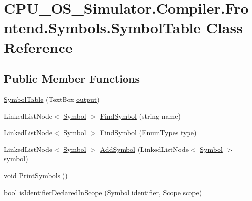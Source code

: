 \hypertarget{class_c_p_u___o_s___simulator_1_1_compiler_1_1_frontend_1_1_symbols_1_1_symbol_table}{}\section{C\+P\+U\+\_\+\+O\+S\+\_\+\+Simulator.\+Compiler.\+Frontend.\+Symbols.\+Symbol\+Table Class Reference}
\label{class_c_p_u___o_s___simulator_1_1_compiler_1_1_frontend_1_1_symbols_1_1_symbol_table}
\subsection*{Public Member Functions}
\begin{DoxyCompactItemize}
\item 
\hyperlink{class_c_p_u___o_s___simulator_1_1_compiler_1_1_frontend_1_1_symbols_1_1_symbol_table_a3198555072680916b69483d09f8a23ca}{Symbol\+Table} (Text\+Box \hyperlink{class_c_p_u___o_s___simulator_1_1_compiler_1_1_frontend_1_1_symbols_1_1_symbol_table_a296a865c0445d3282c0b211853df56db}{output})
\item 
Linked\+List\+Node$<$ \hyperlink{class_c_p_u___o_s___simulator_1_1_compiler_1_1_frontend_1_1_symbols_1_1_symbol}{Symbol} $>$ \hyperlink{class_c_p_u___o_s___simulator_1_1_compiler_1_1_frontend_1_1_symbols_1_1_symbol_table_adf107a69c02c4997630d70bee032559f}{Find\+Symbol} (string name)
\item 
Linked\+List\+Node$<$ \hyperlink{class_c_p_u___o_s___simulator_1_1_compiler_1_1_frontend_1_1_symbols_1_1_symbol}{Symbol} $>$ \hyperlink{class_c_p_u___o_s___simulator_1_1_compiler_1_1_frontend_1_1_symbols_1_1_symbol_table_aa073e0a3a954f8c80a908253154db9ac}{Find\+Symbol} (\hyperlink{namespace_c_p_u___o_s___simulator_1_1_compiler_1_1_frontend_1_1_tokens_a7c0cc43763cc9d01c7d5af34d70b96ea}{Enum\+Types} type)
\item 
Linked\+List\+Node$<$ \hyperlink{class_c_p_u___o_s___simulator_1_1_compiler_1_1_frontend_1_1_symbols_1_1_symbol}{Symbol} $>$ \hyperlink{class_c_p_u___o_s___simulator_1_1_compiler_1_1_frontend_1_1_symbols_1_1_symbol_table_a3e7532efc1e1af447b411f991d96a68b}{Add\+Symbol} (Linked\+List\+Node$<$ \hyperlink{class_c_p_u___o_s___simulator_1_1_compiler_1_1_frontend_1_1_symbols_1_1_symbol}{Symbol} $>$ symbol)
\item 
void \hyperlink{class_c_p_u___o_s___simulator_1_1_compiler_1_1_frontend_1_1_symbols_1_1_symbol_table_a96a4764b3c4e15413c7cca27b0e7d500}{Print\+Symbols} ()
\item 
bool \hyperlink{class_c_p_u___o_s___simulator_1_1_compiler_1_1_frontend_1_1_symbols_1_1_symbol_table_a58dfc6b7e3d6306436a4aa53aebfa085}{is\+Identifier\+Declared\+In\+Scope} (\hyperlink{class_c_p_u___o_s___simulator_1_1_compiler_1_1_frontend_1_1_symbols_1_1_symbol}{Symbol} identifier, \hyperlink{class_c_p_u___o_s___simulator_1_1_compiler_1_1_frontend_1_1_symbols_1_1_scope}{Scope} scope)
\end{DoxyCompactItemize}
